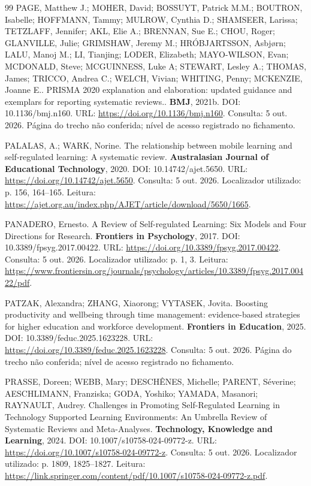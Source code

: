 \begin{thebibliography}{99}
 PAGE, Matthew J.; MOHER, David; BOSSUYT, Patrick M.M.; BOUTRON, Isabelle; HOFFMANN, Tammy; MULROW, Cynthia D.; SHAMSEER, Larissa; TETZLAFF, Jennifer; AKL, Elie A.; BRENNAN, Sue E.; CHOU, Roger; GLANVILLE, Julie; GRIMSHAW, Jeremy M.; HRÓBJARTSSON, Asbjørn; LALU, Manoj M.; LI, Tianjing; LODER, Elizabeth; MAYO-WILSON, Evan; MCDONALD, Steve; MCGUINNESS, Luke A; STEWART, Lesley A.; THOMAS, James; TRICCO, Andrea C.; WELCH, Vivian; WHITING, Penny; MCKENZIE, Joanne E.. PRISMA 2020 explanation and elaboration: updated guidance and exemplars for reporting systematic reviews.. \textbf{BMJ}, 2021b. DOI: 10.1136/bmj.n160. URL: \url{https://doi.org/10.1136/bmj.n160}. Consulta: 5 out. 2026. Página do trecho não conferida; nível de acesso registrado no fichamento.

 PALALAS, A.; WARK, Norine. The relationship between mobile learning and self-regulated learning: A systematic review. \textbf{Australasian Journal of Educational Technology}, 2020. DOI: 10.14742/ajet.5650. URL: \url{https://doi.org/10.14742/ajet.5650}. Consulta: 5 out. 2026. Localizador utilizado: p. 156, 164–165. Leitura: \url{https://ajet.org.au/index.php/AJET/article/download/5650/1665}.

 PANADERO, Ernesto. A Review of Self-regulated Learning: Six Models and Four Directions for Research. \textbf{Frontiers in Psychology}, 2017. DOI: 10.3389/fpsyg.2017.00422. URL: \url{https://doi.org/10.3389/fpsyg.2017.00422}. Consulta: 5 out. 2026. Localizador utilizado: p. 1, 3. Leitura: \url{https://www.frontiersin.org/journals/psychology/articles/10.3389/fpsyg.2017.00422/pdf}.

 PATZAK, Alexandra; ZHANG, Xiaorong; VYTASEK, Jovita. Boosting productivity and wellbeing through time management: evidence-based strategies for higher education and workforce development. \textbf{Frontiers in Education}, 2025. DOI: 10.3389/feduc.2025.1623228. URL: \url{https://doi.org/10.3389/feduc.2025.1623228}. Consulta: 5 out. 2026. Página do trecho não conferida; nível de acesso registrado no fichamento.

 PRASSE, Doreen; WEBB, Mary; DESCHÊNES, Michelle; PARENT, Séverine; AESCHLIMANN, Franziska; GODA, Yoshiko; YAMADA, Masanori; RAYNAULT, Audrey. Challenges in Promoting Self-Regulated Learning in Technology Supported Learning Environments: An Umbrella Review of Systematic Reviews and Meta-Analyses. \textbf{Technology, Knowledge and Learning}, 2024. DOI: 10.1007/s10758-024-09772-z. URL: \url{https://doi.org/10.1007/s10758-024-09772-z}. Consulta: 5 out. 2026. Localizador utilizado: p. 1809, 1825–1827. Leitura: \url{https://link.springer.com/content/pdf/10.1007/s10758-024-09772-z.pdf}.


\end{thebibliography}
